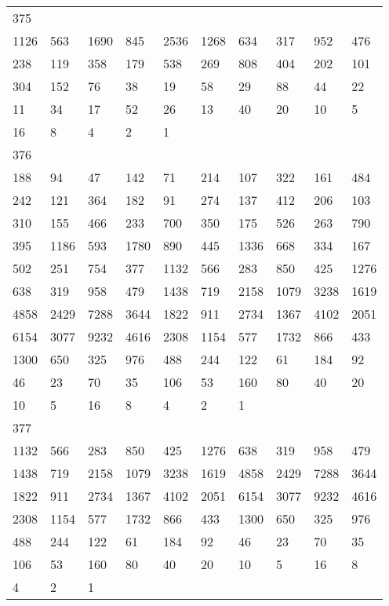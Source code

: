 \begin{longtable}{*{10}{l}}
375&&&&&&&&&\\
1126& 563& 1690& 845& 2536& 1268& 634& 317& 952& 476\\
238& 119& 358& 179& 538& 269& 808& 404& 202& 101\\
304& 152& 76& 38& 19& 58& 29& 88& 44& 22\\
11& 34& 17& 52& 26& 13& 40& 20& 10& 5\\
16& 8& 4& 2& 1& \\

376&&&&&&&&&\\
188& 94& 47& 142& 71& 214& 107& 322& 161& 484\\
242& 121& 364& 182& 91& 274& 137& 412& 206& 103\\
310& 155& 466& 233& 700& 350& 175& 526& 263& 790\\
395& 1186& 593& 1780& 890& 445& 1336& 668& 334& 167\\
502& 251& 754& 377& 1132& 566& 283& 850& 425& 1276\\
638& 319& 958& 479& 1438& 719& 2158& 1079& 3238& 1619\\
4858& 2429& 7288& 3644& 1822& 911& 2734& 1367& 4102& 2051\\
6154& 3077& 9232& 4616& 2308& 1154& 577& 1732& 866& 433\\
1300& 650& 325& 976& 488& 244& 122& 61& 184& 92\\
46& 23& 70& 35& 106& 53& 160& 80& 40& 20\\
10& 5& 16& 8& 4& 2& 1& \\

377&&&&&&&&&\\
1132& 566& 283& 850& 425& 1276& 638& 319& 958& 479\\
1438& 719& 2158& 1079& 3238& 1619& 4858& 2429& 7288& 3644\\
1822& 911& 2734& 1367& 4102& 2051& 6154& 3077& 9232& 4616\\
2308& 1154& 577& 1732& 866& 433& 1300& 650& 325& 976\\
488& 244& 122& 61& 184& 92& 46& 23& 70& 35\\
106& 53& 160& 80& 40& 20& 10& 5& 16& 8\\
4& 2& 1& \\


\end{longtable}
